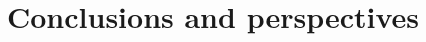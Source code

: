 \documentclass[../main.tex]{subfiles}
\begin{document}
\section[Conclusions and perspectives]{Conclusions and perspectives}
\label{sec:concl-persp}
\end{document}
